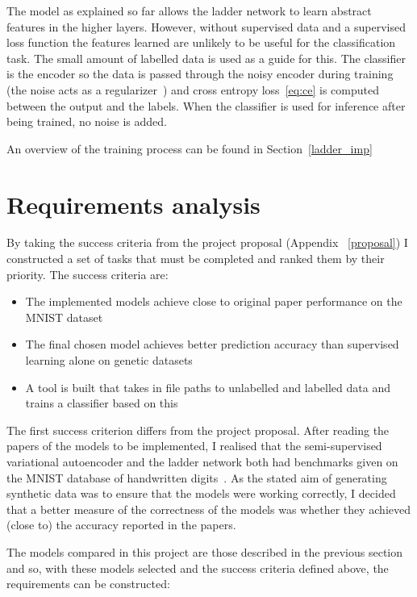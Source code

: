 The model as explained so far allows the ladder network to learn abstract features in the higher layers. However, without supervised data and a supervised loss function the 
features learned are unlikely to be useful for the classification task. The small amount of labelled data is used as a guide for this. The classifier 
is the encoder so the data is passed through the noisy encoder during training (the noise acts as a regularizer~\cite{NoiseInj}) and cross entropy 
loss~\ref{eq:ce} is computed between the output and the labels. When the classifier is used for inference after being trained, no noise is 
added.

An overview of the training process can be found in Section~\ref{ladder_imp}

\section{Requirements analysis}

By taking the success criteria from the project proposal (Appendix ~\ref{proposal}) I constructed a set of tasks that must be completed 
and ranked them by their priority. The success criteria are:

\begin{itemize}
  \item The implemented models achieve close to original paper performance on the MNIST dataset 
  \item The final chosen model achieves better prediction accuracy than supervised learning alone on genetic datasets
  \item A tool is built that takes in file paths to unlabelled and labelled data and trains a classifier based on this
\end{itemize}

The first success criterion differs from the project proposal. After reading the papers of the models to be implemented, I 
realised that the semi-supervised variational autoencoder and the ladder network both had benchmarks given on 
the MNIST database of handwritten digits~\cite{lecun-mnisthandwrittendigit-2010}. As the stated aim of generating synthetic data was to
ensure that the models were working correctly, I decided that a better measure of the correctness of the models was whether they
achieved (close to) the accuracy reported in the papers.

The models compared in this project are those described in the previous section and so, with these models selected and the success criteria 
defined above, the requirements can be constructed:

